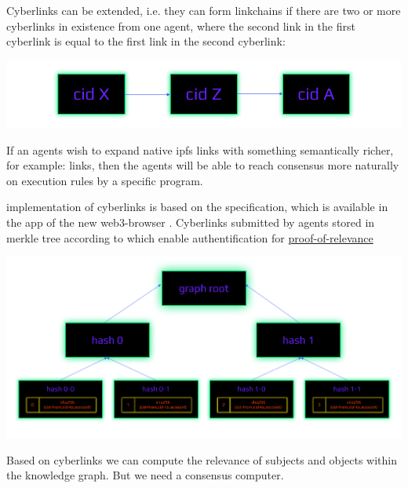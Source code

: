 \documentclass[8pt,oneside]{amsart}
\newcommand{\linkred}[2]{\href{#1}{\color{red}{#2}}}
\newcommand{\linkgreen}[2]{\href{#1}{\color{green}{#2}}}
\newenvironment{Figure}
  {\par\medskip\noindent\minipage{\linewidth}}
  {\endminipage\par\medskip}
\begin{document}
Cyberlinks can be extended, i.e. they can form linkchains if there are two or more cyberlinks in existence from one agent, where the second link in the first cyberlink is equal to the first link in the second cyberlink:

\begin{Figure}
    \centering
    \includegraphics[width=1\textwidth]{linkchain.png}
\end{Figure}

If an agents wish to expand native ipfs links with something semantically richer, for example:
\linkred{https://github.com/cybercongress/cyb/blob/dev/docs/dura.md}{dura}
links, then the agents will be able to reach consensus more naturally on execution rules by a specific program.

\linkred{https://github.com/cybercongress/cyberd}{cyber} implementation of {cyberlinks} is based on the \linkred{https://github.com/cybercongress/cyb/blob/dev/docs/dura.md}{DURA} specification, which is available in the \linkred{https://github.com/cybercongress/.cyber}{.cyber} app of the new web3-browser \linkred{https://github.com/cybercongress/cyb}{cyb}. Cyberlinks submitted by agents stored in merkle tree according to \linkgreen{https://tools.ietf.org/html/rfc6962#section-2.1}{RFC-6962 standard} which enable authentification for {\hyperref[proof-of-relevance]{proof-of-relevance}}

\begin{Figure}
    \centering
    \includegraphics[width=1\textwidth]{graph-tree.png}
\end{Figure}

Based on cyberlinks we can compute the relevance of subjects and objects within the knowledge graph. But we need a consensus computer.
\end{document}
